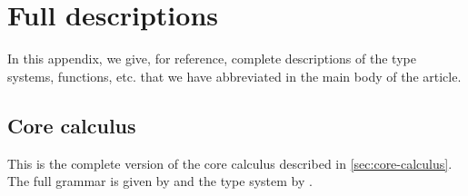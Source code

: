 \documentclass[acmsmall,usenames,dvipsnames,natbib=false,acmthm=false,screen]{acmart}
\theoremstyle{acmplain}
\theoremstyle{acmdefinition}
\begin{document}



% 
% 
\printbibliography
\newpage

\appendix

\section{Full descriptions}
\label{sec:appendix:full-descriptions}

In this appendix, we give, for reference, complete descriptions of the
type systems, functions, etc. that we have abbreviated in the main %
body of the article.

\subsection{Core calculus}
\label{sec:appendix:core-calculus}

This is the complete version of the core calculus described in
\cref{sec:core-calculus}. The full grammar is given by
 and the type system by
.
\end{document}
